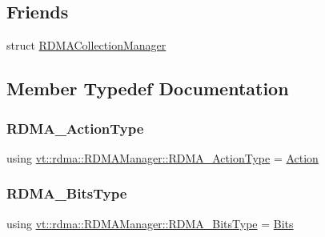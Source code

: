 \subsection*{Friends}
\begin{DoxyCompactItemize}
\item 
struct \hyperlink{structvt_1_1rdma_1_1_r_d_m_a_manager_a59e73ef8c81ddf4094802bfda5ac42cc}{R\+D\+M\+A\+Collection\+Manager}
\end{DoxyCompactItemize}


\subsection{Member Typedef Documentation}
\mbox{\label{structvt_1_1rdma_1_1_r_d_m_a_manager_a7b857edc3e489efd9e65e160a4e55a68}} 
\subsubsection{\texorpdfstring{R\+D\+M\+A\+\_\+\+Action\+Type}{RDMA\_ActionType}}
{\footnotesize\ttfamily using \hyperlink{structvt_1_1rdma_1_1_r_d_m_a_manager_a7b857edc3e489efd9e65e160a4e55a68}{vt\+::rdma\+::\+R\+D\+M\+A\+Manager\+::\+R\+D\+M\+A\+\_\+\+Action\+Type} =  \hyperlink{structvt_1_1rdma_1_1_action}{Action}}

\mbox{\label{structvt_1_1rdma_1_1_r_d_m_a_manager_a1fd134fc514587ac616aec8530c7cc87}} 
\subsubsection{\texorpdfstring{R\+D\+M\+A\+\_\+\+Bits\+Type}{RDMA\_BitsType}}
{\footnotesize\ttfamily using \hyperlink{namespacevt_1_1rdma_a91e7211515508952960ca446ea609f65}{vt\+::rdma\+::\+R\+D\+M\+A\+Manager\+::\+R\+D\+M\+A\+\_\+\+Bits\+Type} =  \hyperlink{namespacevt_1_1rdma_a91e7211515508952960ca446ea609f65}{Bits}}

